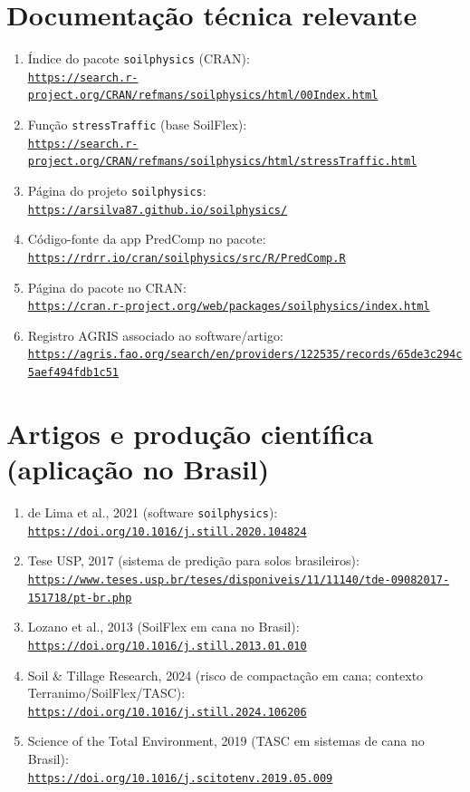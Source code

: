 \documentclass[12pt,a4paper]{article}
\newcommand{\Section}[1]{\needspace{12\baselineskip}\section{#1}}
\newcommand{\Link}[1]{\href{#1}{\nolinkurl{#1}}}
\newenvironment{NoBreakEnumerate}
{\begin{samepage}\begin{enumerate}}
{\end{enumerate}\end{samepage}}
\begin{document}
\Section{Documentação técnica relevante}
\begin{NoBreakEnumerate}
  \item Índice do pacote \texttt{soilphysics} (CRAN):\\
  \Link{https://search.r-project.org/CRAN/refmans/soilphysics/html/00Index.html}

  \item Função \texttt{stressTraffic} (base SoilFlex):\\
  \Link{https://search.r-project.org/CRAN/refmans/soilphysics/html/stressTraffic.html}

  \item Página do projeto \texttt{soilphysics}:\\
  \Link{https://arsilva87.github.io/soilphysics/}

  \item Código-fonte da app PredComp no pacote:\\
  \Link{https://rdrr.io/cran/soilphysics/src/R/PredComp.R}

  \item Página do pacote no CRAN:\\
  \Link{https://cran.r-project.org/web/packages/soilphysics/index.html}

  \item Registro AGRIS associado ao software/artigo:\\
  \Link{https://agris.fao.org/search/en/providers/122535/records/65de3c294c5aef494fdb1c51}
\end{NoBreakEnumerate}

\Section{Artigos e produção científica (aplicação no Brasil)}
\begin{NoBreakEnumerate}
  \item de Lima et al., 2021 (software \texttt{soilphysics}):\\
  \Link{https://doi.org/10.1016/j.still.2020.104824}

  \item Tese USP, 2017 (sistema de predição para solos brasileiros):\\
  \Link{https://www.teses.usp.br/teses/disponiveis/11/11140/tde-09082017-151718/pt-br.php}

  \item Lozano et al., 2013 (SoilFlex em cana no Brasil):\\
  \Link{https://doi.org/10.1016/j.still.2013.01.010}

  \item Soil \& Tillage Research, 2024 (risco de compactação em cana; contexto Terranimo/SoilFlex/TASC):\\
  \Link{https://doi.org/10.1016/j.still.2024.106206}

  \item Science of the Total Environment, 2019 (TASC em sistemas de cana no Brasil):\\
  \Link{https://doi.org/10.1016/j.scitotenv.2019.05.009}
\end{NoBreakEnumerate}
\end{document}
